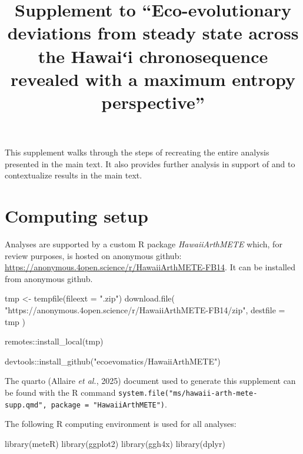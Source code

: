 \documentclass[
  letterpaper,
  DIV=11,
  numbers=noendperiod]{scrartcl}
\title{Supplement to ``Eco-evolutionary deviations from steady state
across the Hawaiʻi chronosequence revealed with a maximum entropy
perspective''}
\author{}
\date{}
\newenvironment{Shaded}{\begin{snugshade}}{\end{snugshade}}
\newcommand{\AttributeTok}[1]{\textcolor[rgb]{0.40,0.45,0.13}{#1}}
\newcommand{\FunctionTok}[1]{\textcolor[rgb]{0.28,0.35,0.67}{#1}}
\newcommand{\NormalTok}[1]{\textcolor[rgb]{0.00,0.23,0.31}{#1}}
\newcommand{\OtherTok}[1]{\textcolor[rgb]{0.00,0.23,0.31}{#1}}
\newcommand{\SpecialCharTok}[1]{\textcolor[rgb]{0.37,0.37,0.37}{#1}}
\newcommand{\StringTok}[1]{\textcolor[rgb]{0.13,0.47,0.30}{#1}}
\begin{document}
\maketitle


This supplement walks through the steps of recreating the entire
analysis presented in the main text. It also provides further analysis
in support of and to contextualize results in the main text.

\section{Computing setup}\label{sec-setup}

Analyses are supported by a custom R package \emph{HawaiiArthMETE}
which, for review purposes, is hosted on anonymous github:
\url{https://anonymous.4open.science/r/HawaiiArthMETE-FB14}. It can be
installed from anonymous github.

\begin{Shaded}
\begin{Highlighting}[]
\NormalTok{tmp }\OtherTok{\textless{}{-}} \FunctionTok{tempfile}\NormalTok{(}\AttributeTok{fileext =} \StringTok{".zip"}\NormalTok{)}
\FunctionTok{download.file}\NormalTok{(}
    \StringTok{"https://anonymous.4open.science/r/HawaiiArthMETE{-}FB14/zip"}\NormalTok{,}
    \AttributeTok{destfile =}\NormalTok{ tmp}
\NormalTok{)}

\NormalTok{remotes}\SpecialCharTok{::}\FunctionTok{install\_local}\NormalTok{(tmp)}

\NormalTok{devtools}\SpecialCharTok{::}\FunctionTok{install\_github}\NormalTok{(}\StringTok{"ecoevomatics/HawaiiArthMETE"}\NormalTok{)}
\end{Highlighting}
\end{Shaded}

The quarto (Allaire \emph{et al.}, 2025) document used to generate this
supplement can be found with the R command
\texttt{system.file("ms/hawaii-arth-mete-supp.qmd",\ package\ =\ "HawaiiArthMETE")}.

The following R computing environment is used for all analyses:

\begin{Shaded}
\begin{Highlighting}[]
\FunctionTok{library}\NormalTok{(meteR)}
\FunctionTok{library}\NormalTok{(ggplot2)}
\FunctionTok{library}\NormalTok{(ggh4x)}
\FunctionTok{library}\NormalTok{(dplyr)}
\end{Highlighting}
\end{Shaded}
\end{document}
